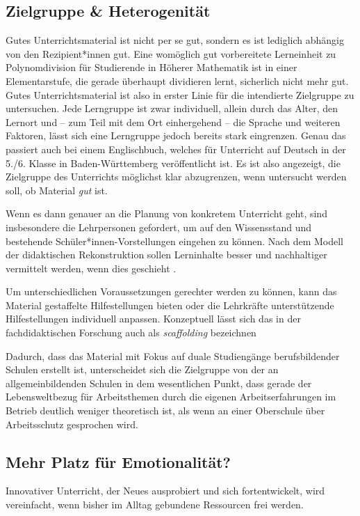 \subsection{Zielgruppe \& Heterogenität \label{Zielgruppe}}
Gutes Unterrichtsmaterial ist nicht per se gut, sondern es ist lediglich abhängig von den Rezipient*innen gut. Eine womöglich gut vorbereitete Lerneinheit zu Polynomdivision für Studierende in Höherer Mathematik ist in einer Elementarstufe, die gerade überhaupt dividieren lernt, sicherlich nicht mehr gut. Gutes Unterrichtsmaterial ist also in erster Linie für die intendierte Zielgruppe zu untersuchen. Jede Lerngruppe ist zwar individuell, allein durch das Alter, den Lernort und -- zum Teil  mit dem Ort einhergehend -- die Sprache und weiteren Faktoren, lässt sich eine Lerngruppe jedoch bereits stark eingrenzen. Genau das passiert auch bei einem Englischbuch, welches für Unterricht auf Deutsch in der 5./6. Klasse in Baden-Württemberg veröffentlicht ist. 
Es ist also angezeigt, die Zielgruppe des Unterrichts möglichst klar abzugrenzen, wenn untersucht werden soll, ob Material \emph{gut} ist. 

Wenn es dann genauer an die Planung von konkretem Unterricht geht, sind insbesondere die Lehrpersonen gefordert, um auf den Wissensstand und bestehende Schüler*innen-Vorstellungen eingehen zu können. Nach dem Modell der didaktischen Rekonstruktion sollen Lerninhalte besser und nachhaltiger vermittelt werden, wenn dies geschieht \autocite[404-406]{Reinfried2009}.

Um unterschiedlichen Voraussetzungen gerechter werden zu können, kann das Material gestaffelte Hilfestellungen bieten oder die Lehrkräfte unterstützende Hilfestellungen individuell anpassen. Konzeptuell lässt sich das in der fachdidaktischen Forschung auch als \emph{scaffolding} bezeichnen \autocites[Zur historischen Entwicklung des Begriffs \gls{vgl}][]{Shvarts.2019}[Eine Betrachtung von scaffolding für Englisch als Zweitsprache zeigten \gls{zb}][]{Hammond2005}


Dadurch, dass das Material mit Fokus auf duale Studiengänge berufsbildender Schulen erstellt ist, unterscheidet sich die Zielgruppe von der an allgemeinbildenden Schulen in dem wesentlichen Punkt, dass gerade der Lebensweltbezug für Arbeitsthemen durch die eigenen Arbeitserfahrungen im Betrieb deutlich weniger theoretisch ist, als wenn an einer Oberschule über Arbeitsschutz gesprochen wird. 



\subsection{Mehr Platz für Emotionalität? \label{Emotionen}}
Innovativer Unterricht, der Neues ausprobiert und sich fortentwickelt, wird vereinfacht, wenn bisher im Alltag gebundene Ressourcen frei werden. 
\bigskip

